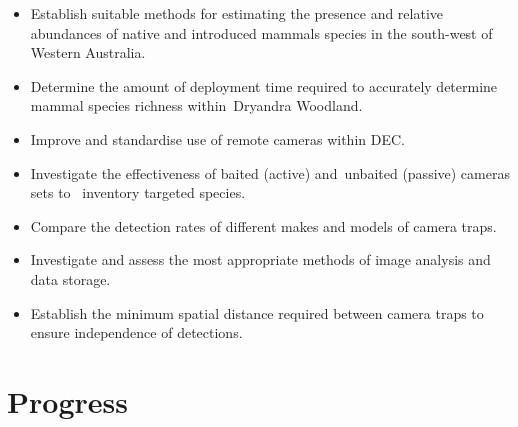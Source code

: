 \documentclass[version=last, paper=a4, DIV=18, usenames, dvipsnames]{scrartcl}
\begin{document}
\begin{itemize}

  \item Establish suitable methods for estimating the presence and relative abundances of native and introduced mammals species in the south-west of Western Australia.

  \item Determine the amount of deployment time required to accurately determine mammal species richness within Dryandra Woodland.

  \item Improve and standardise use of remote cameras within DEC.

  \item Investigate the effectiveness of baited (active) and unbaited (passive) cameras sets to  inventory targeted species.

  \item Compare the detection rates of different makes and models of camera traps.

  \item Investigate and assess the most appropriate methods of image analysis and data storage.

  \item Establish the minimum spatial distance required between camera traps to ensure independence of detections.

\end{itemize}






\section{Progress}
\end{document}
